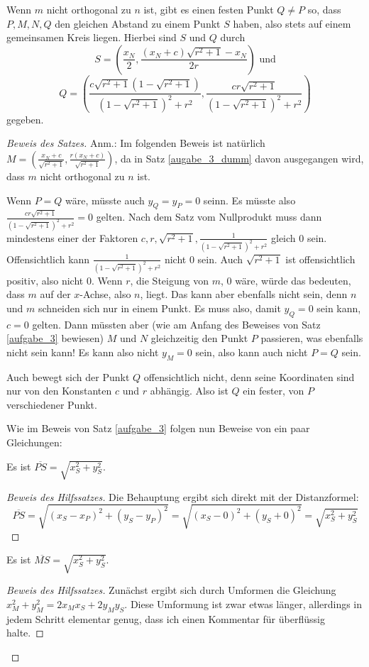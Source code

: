 \begin{thm}\label{augabe_3_dumm}
    Wenn $m$ nicht orthogonal zu $n$ ist, gibt es einen festen Punkt $Q\neq P$ so, dass $P, M, N, Q$ 
    den gleichen Abstand zu einem Punkt $S$ haben, also stets auf einem gemeinsamen Kreis liegen. 
    Hierbei sind $S$ und $Q$ durch
    \[
    S=\left(\frac{x_N}{2},\frac{(x_N+c)\sqrt{r^2+1}-x_N}{2r}\right)\text{ und}
    \]
    \[
    Q=\left(\frac{c\sqrt{r^2+1}\left(1-\sqrt{r^2+1}\right)}{\left(1-\sqrt{r^2+1}\right)^2+r^2}, 
    \frac{cr\sqrt{r^2+1}}{\left(1-\sqrt{r^2+1}\right)^2+r^2}\right)
    \]
    gegeben.
\end{thm}
\begin{proof}[Beweis des Satzes]
    \renewcommand{\qedsymbol}{$\square$}
    Anm.: Im folgenden Beweis ist natürlich $M=\left( \frac{x_N+c}{\sqrt{r^2+1}} , \frac{r(x_N+c)}{\sqrt{r^2+1}} 
    \right)$, da in Satz \ref{augabe_3_dumm} davon ausgegangen wird, dass $m$ nicht orthogonal zu $n$ ist.

    Wenn $P=Q$ wäre, müsste auch $y_Q=y_P=0$ seinn. Es müsste also $\frac{cr\sqrt{r^2+1}}{(1-\sqrt{r^2+1})^2+r^2}
    =0$ gelten. Nach dem Satz vom Nullprodukt muss dann mindestens einer der Faktoren $c, r, \sqrt{r^2+1}, 
    \frac{1}{(1-\sqrt{r^2+1})^2+r^2}$ gleich 0 sein. Offensichtlich kann $\frac{1}{(1-\sqrt{r^2+1})^2+r^2}$ nicht 0 
    sein. Auch $\sqrt{r^2+1}$ ist offensichtlich positiv, also nicht 0. Wenn $r$, die Steigung von $m$, 0 wäre, 
    würde das bedeuten, dass $m$ auf der $x$-Achse, also $n$, liegt. Das kann aber ebenfalls nicht sein, denn $n$ 
    und $m$ schneiden sich nur in einem Punkt. Es muss also, damit $y_Q=0$ sein kann, $c=0$ gelten. Dann müssten 
    aber (wie am Anfang des Beweises von Satz \ref{aufgabe_3} bewiesen) $M$ und $N$ gleichzeitig den Punkt $P$ 
    passieren, was ebenfalls nicht sein kann! Es kann also nicht $y_M=0$ sein, also kann auch nicht $P=Q$ sein.

    Auch bewegt sich der Punkt $Q$ offensichtlich nicht, denn seine Koordinaten sind nur von den Konstanten $c$ und 
    $r$ abhängig. Also ist $Q$ ein fester, von $P$ verschiedener Punkt.

    Wie im Beweis von Satz \ref{aufgabe_3} folgen nun Beweise von ein paar Gleichungen:
    \begin{lem}\label{dumm_P}
        Es ist $\overline{PS}=\sqrt{x_S^2+y_S^2}$.
    \end{lem}
    \begin{proof}[Beweis des Hilfssatzes]
        Die Behauptung ergibt sich direkt mit der Distanzformel:
        \[
        \overline{PS}=\sqrt{(x_S-x_P)^2+(y_S-y_P)^2}=\sqrt{(x_S-0)^2+(y_S+0)^2}=\sqrt{x_S^2+y_S^2}    
        \]
    \end{proof}
    \begin{lem}\label{dumm_M}
        Es ist $\overline{MS}=\sqrt{x_S^2+y_S^2}$.
    \end{lem}
    \begin{proof}[Beweis des Hilfssatzes]
        Zunächst ergibt sich durch Umformen die Gleichung $x_M^2+y_M^2=2x_Mx_S+2y_My_S$. Diese Umformung ist 
        zwar etwas länger, allerdings in jedem Schritt elementar genug, dass ich einen Kommentar für überflüssig 
        halte.


\end{proof}
\end{proof}
